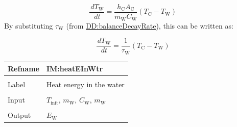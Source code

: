 \documentclass[12pt]{article}
\begin{document}
\begin{displaymath}
\frac{\,d{T_{\text{W}}}}{\,dt}=\frac{{h_{\text{C}}} {A_{\text{C}}}}{{m_{\text{W}}} {C_{\text{W}}}} \left({T_{\text{C}}}-{T_{\text{W}}}\right)
\end{displaymath}
By substituting ${τ_{\text{W}}}$ (from \hyperref[DD:balanceDecayRate]{DD:balanceDecayRate}), this can be written as:

\begin{displaymath}
\frac{\,d{T_{\text{W}}}}{\,dt}=\frac{1}{{τ_{\text{W}}}} \left({T_{\text{C}}}-{T_{\text{W}}}\right)
\end{displaymath}
\vspace{\baselineskip}
\noindent
\begin{minipage}{\textwidth}
\begin{tabular}{>{\raggedright}p{}>{\raggedright\arraybackslash}p{}}
\toprule \textbf{Refname} & \textbf{IM:heatEInWtr}
\label{IM:heatEInWtr}
\\ \midrule \\
Label & Heat energy in the water
        
\\ \midrule \\
Input & ${T_{\text{init}}}$, ${m_{\text{W}}}$, ${C_{\text{W}}}$, ${m_{\text{W}}}$
        
\\ \midrule \\
Output & ${E_{\text{W}}}$
         

\end{tabular}
\end{minipage}
\end{document}
